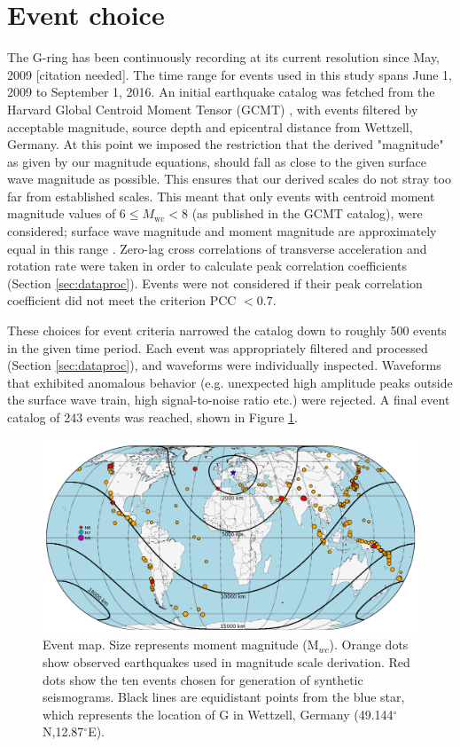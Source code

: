 \documentclass{gji}
\begin{document}
\section{Event choice}
The G-ring has been continuously recording at its current resolution since May, 2009 [citation needed]. 
The time range for events used in this study spans June 1, 2009 to September 1, 2016. An initial earthquake catalog was fetched from the Harvard Global Centroid Moment Tensor (GCMT) \cite{ekstrom2012global},
with events filtered by acceptable magnitude, source depth and epicentral distance from Wettzell, Germany. At this point we imposed the restriction that the derived 
"magnitude" as given by our magnitude equations, should fall as close to the given surface wave magnitude as possible. This ensures that our derived scales do not stray too far from established scales. This meant that only events with centroid moment magnitude values of $6 \le M_{\text{wc}} < 8$ (as published in the GCMT catalog), were considered;   surface wave magnitude and moment magnitude are approximately equal in this range \cite{shearer2009introduction}.
 Zero-lag cross correlations of transverse acceleration and rotation rate were taken in order to calculate peak correlation coefficients (Section \ref{sec:dataproc}). Events were not considered if their peak correlation coefficient did not meet the criterion PCC $< 0.7$. 

These choices for event criteria narrowed the catalog down to roughly 500 events in the given time period. Each event was appropriately filtered and processed (Section \ref{sec:dataproc}), and waveforms were individually inspected. Waveforms that exhibited anomalous behavior (e.g. unexpected high amplitude peaks outside the surface wave train, high signal-to-noise ratio etc.) were rejected. A final event catalog of 243 events was reached, shown in Figure \ref{fig:event_map}.

\begin{figure}
\centerline{\includegraphics[width=.8\textwidth]{event_map}}
\caption{Event map. Size represents moment magnitude (M$_{wc}$). Orange dots show observed earthquakes used in magnitude scale derivation. Red dots show the ten events chosen for generation of synthetic seismograms. Black lines are equidistant points from the blue star, which represents the location of G in Wettzell, Germany (49.144$^\circ$N,12.87$^\circ$E).}
\label{fig:event_map}
\end{figure}
\end{document}
